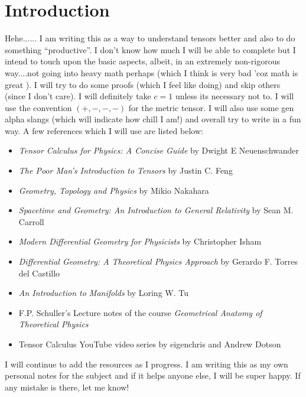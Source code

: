 \section{Introduction}
Hehe...... I am writing this as a way to understand tensors better and also to do something ``productive''. I don't know how much I will be able to complete but I intend to touch upon the basic aspects, albeit, in an extremely non-rigorous way....not going into heavy math perhaps (which I think is very bad 'coz math is great ). I will try to do some proofs (which I feel like doing) and skip others (since I don't care). I will definitely take $c=1$ unless its necessary not to. I will use the convention $(+,-,-,-)$ for the metric tensor. I will also use some gen alpha slangs (which will indicate how chill I am!) and overall try to write in a fun way. A few references which I will use are listed below:
\begin{itemize}
    \item \textit{Tensor Calculus for Physics: A Concise Guide
} by Dwight E Neuenschwander
\item \textit{The Poor Man’s Introduction to Tensors} by Justin C. Feng
\item \textit{Geometry, Topology and Physics} by Mikio Nakahara
\item \textit{Spacetime and Geometry: An Introduction to General Relativity} by Sean M. Carroll
\item \textit{Modern Differential Geometry for Physicists} by Christopher Isham
\item \textit{Differential Geometry: A Theoretical Physics Approach} by Gerardo F. Torres del Castillo
\item \textit{An Introduction to Manifolds} by Loring W. Tu
\item F.P. Schuller's Lecture notes of the course \textit{Geometrical Anatomy of Theoretical Physics}
\item Tensor Calculus YouTube video series by eigenchris and Andrew Dotson
\end{itemize}
I will continue to add the resources as I progress. I am writing this as my own personal notes for the subject and if it helps anyone else, I will be super happy. If any mistake is there, let me know! 